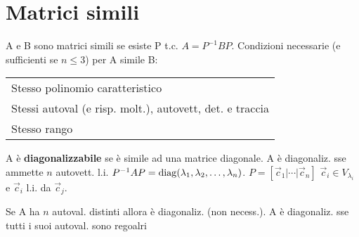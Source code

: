 \section{Matrici simili}

A e B sono matrici simili se esiste P t.c. $A = P^{-1}BP$. Condizioni necessarie (e sufficienti se $n \le 3$) per A simile B:

\begin{tabular}{l}
	Stesso polinomio caratteristico \\
	Stessi autoval (e risp. molt.), autovett, det. e traccia \\
	Stesso rango
\end{tabular}

A è \textbf{diagonalizzabile} se è simile ad una matrice diagonale. A è diagonaliz. sse ammette $n$ autovett. l.i. $P^{-1}AP = \mathrm{diag}(\lambda_1, \lambda_2, \dots, \lambda_n)$. $P=[ \vec{c}_1 | \cdots | \vec{c}_n ]$ $\vec{c}_i \in V_{\lambda_i}$ e $\vec{c}_i$ l.i. da $\vec{c}_j$.

Se A ha $n$ autoval. distinti allora è diagonaliz. (non necess.). A è diagonaliz. sse tutti i suoi autoval. sono regoalri
